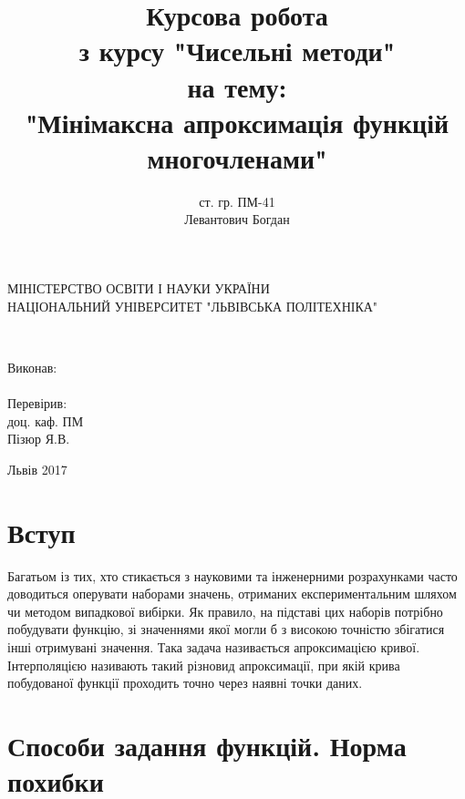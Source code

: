 \documentclass[ukrainian,14pt]{extarticle}
\begin{document}
\title{
	Курсова робота \\
	з курсу "Чисельні методи" \\
	на тему:\\
    "Мінімаксна апроксимація функцій многочленами"
}
\author{ст. гр. ПМ-41 \\  Левантович Богдан}

\makeatletter
\begin{titlepage}
        \centering
	МІНІСТЕРСТВО ОСВІТИ І НАУКИ УКРАЇНИ \\
	НАЦІОНАЛЬНИЙ УНІВЕРСИТЕТ "ЛЬВІВСЬКА ПОЛІТЕХНІКА"
	\vspace{\fill}

	\@title \\
	\vspace{120pt}
	\raggedright
        \setlength{\leftskip}{11cm}
	Виконав:\\
	\@author\\
        Перевірив:\\
        доц. каф. ПМ \\
        Пізюр Я.В.\\
        \setlength{\leftskip}{0cm}
	\vspace{110pt}
	\centering


	Львів 2017
\end{titlepage}
\makeatother

\setcounter{page}{2}
\tableofcontents

\newpage


\section*{Вступ}



Багатьом із тих, хто стикається з науковими та інженерними розрахунками часто доводиться оперувати наборами значень, отриманих експериментальним шляхом чи методом випадкової вибірки. Як правило, на підставі цих наборів потрібно побудувати функцію, зі значеннями якої могли б з високою точністю збігатися інші отримувані значення. Така задача називається апроксимацією кривої. Інтерполяцією називають такий різновид апроксимації, при якій крива побудованої функції проходить точно через наявні точки даних.

\newpage
\section{Способи задання функцій. Норма похибки}
\end{document}
